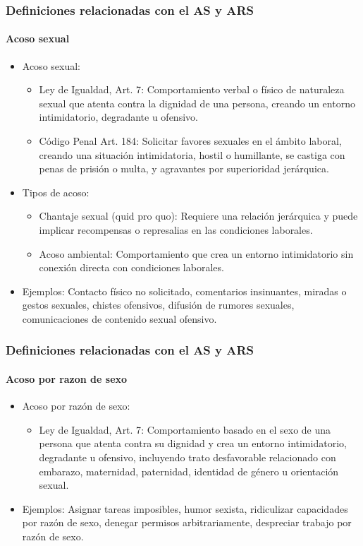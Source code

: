 \documentclass{beamer}
\newcommand{\highlight}[1]{{\color{Blue} #1}}
\begin{document}
    \begin{frame}
        \frametitle{Definiciones relacionadas con el AS y ARS}
        \framesubtitle{Acoso sexual}
        \begin{itemize}
            \item Acoso sexual:
            \begin{itemize}
                \item \highlight{Ley de Igualdad, Art. 7}: Comportamiento verbal o físico de naturaleza sexual que atenta contra la dignidad de una persona, creando un entorno intimidatorio, degradante u ofensivo.
                \item \highlight{Código Penal Art. 184}: Solicitar favores sexuales en el ámbito laboral, creando una situación intimidatoria, hostil o humillante, se castiga con penas de prisión o multa, y agravantes por superioridad jerárquica.
            \end{itemize}
            \item Tipos de acoso:
            \begin{itemize}
                \item \highlight{Chantaje sexual (quid pro quo)}: Requiere una relación jerárquica y puede implicar recompensas o represalias en las condiciones laborales.
                \item \highlight{Acoso ambiental}: Comportamiento que crea un entorno intimidatorio sin conexión directa con condiciones laborales.
            \end{itemize}
            \item \highlight{Ejemplos}: Contacto físico no solicitado, comentarios insinuantes, miradas o gestos sexuales, chistes ofensivos, difusión de rumores sexuales, comunicaciones de contenido sexual ofensivo.
        \end{itemize}
    \end{frame}

    \begin{frame}
        \frametitle{Definiciones relacionadas con el AS y ARS}
        \framesubtitle{Acoso por razon de sexo}
        \begin{itemize}
            \item Acoso por razón de sexo:
            \begin{itemize}
                \item \highlight{Ley de Igualdad, Art. 7}: Comportamiento basado en el sexo de una persona que atenta contra su dignidad y crea un entorno intimidatorio, degradante u ofensivo, incluyendo trato desfavorable relacionado con embarazo, maternidad, paternidad, identidad de género u orientación sexual.
            \end{itemize}
            \item \highlight{Ejemplos}: Asignar tareas imposibles, humor sexista, ridiculizar capacidades por razón de sexo, denegar permisos arbitrariamente, despreciar trabajo por razón de sexo.
        \end{itemize}
    \end{frame}
\end{document}
